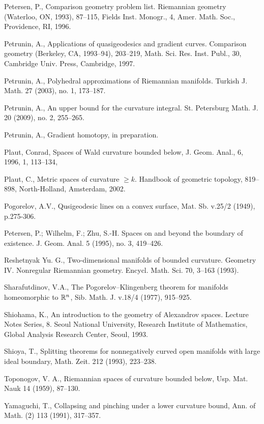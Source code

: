 \documentclass{article}
\begin{document}
\begin{thebibliography}{Bibliography}
Petersen, P.,
Comparison geometry problem list. 
Riemannian geometry (Waterloo, ON, 1993), 87--115,
Fields Inst. Monogr., 4, Amer. Math. Soc., Providence, RI, 1996. 

Petrunin, A., 
Applications of quasigeodesics and gradient curves.  
Comparison geometry (Berkeley, CA, 1993--94),  203--219,
Math. Sci. Res. Inst. Publ., 30, Cambridge Univ. Press, Cambridge, 1997.

Petrunin, A.,
Polyhedral approximations of Riemannian manifolds.  
Turkish J. Math.  27  (2003),  no. 1, 173--187.

Petrunin, A., 
An upper bound for the curvature integral. 
St. Petersburg Math. J. 20 (2009), no. 2, 255--265.

Petrunin, A., 
Gradient homotopy, 
in preparation.

 {Plaut, Conrad},
      {Spaces of Wald curvature bounded below},
    {J. Geom. Anal.},
     {6},
     {1996},
     {1},
      {113--134},

Plaut, C., 
Metric spaces of curvature $\ge k$. 
Handbook of geometric topology,  
819--898, North-Holland, Amsterdam, 2002.

 Pogorelov, A.V., 
Qusigeodesic lines on a convex surface, Mat. Sb. v.25/2
(1949), p.275-306.

Petersen, P.; Wilhelm, F.;
Zhu, S.-H.
Spaces on and beyond the boundary of existence. 
J. Geom. Anal. 5 (1995), no. 3, 419--426.

Reshetnyak Yu. G., Two-dimensional manifolds of bounded curvature.  Geometry IV. Nonregular Riemannian geometry. Encycl. Math. Sci. 70,
3--163 (1993).

Sharafutdinov, V.A., 
The Pogorelov--Klingenberg
theorem for manifolds homeomorphic to $\mathbb{R}^n$, Sib. Math. J. v.18/4 (1977),
915--925.

Shiohama, K., 
An introduction to the geometry of
Alexandrov spaces. 
Lecture Notes Series, 8. Seoul National University, Research
Institute of Mathematics, Global Analysis Research Center, Seoul, 1993.

  Shioya, T., 
Splitting theorems for nonnegatively curved open manifolds
with large ideal boundary, Math. Zeit. 212 (1993), 223--238.

Toponogov, V. A.,
Riemannian spaces of curvature bounded below,
Usp. Mat. Nauk 14 (1959), 87--130.

 Yamaguchi, T., 
Collapsing and pinching under a lower curvature
bound, Ann. of Math. (2) 113 (1991), 317--357.
\end{thebibliography}
\end{document}

